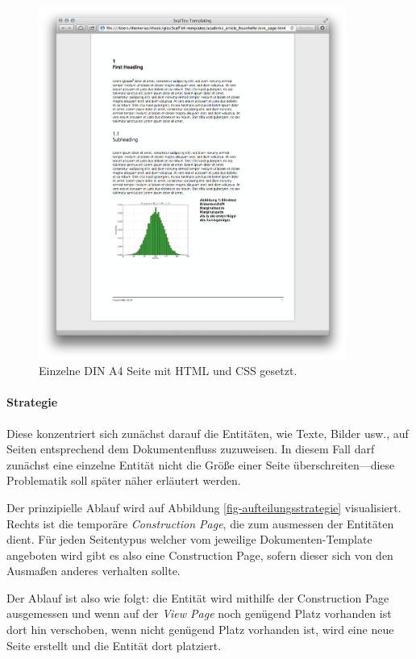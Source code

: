 \newpage
\begin{figure}[h!]
  \centering
    \includegraphics[width=0.9\textwidth]{figures/one_page.png}
  \caption{Einzelne DIN A4 Seite mit HTML und CSS gesetzt.}\label{fig-one_page}
\end{figure}
\newpage

\paragraph{Strategie}
Diese konzentriert sich zunächst darauf die Entitäten, wie Texte, Bilder usw.,
auf Seiten entsprechend dem Dokumentenfluss zuzuweisen.
In diesem Fall darf zunächst eine
einzelne Entität nicht die Größe einer Seite überschreiten---diese
Problematik soll später näher erläutert werden.

Der prinzipielle Ablauf wird auf Abbildung \ref{fig-aufteilungsstrategie}
visualisiert. Rechts ist die temporäre \emph{Construction Page}, die zum
ausmessen der Entitäten dient. Für jeden Seitentypus welcher vom jeweilige
Dokumenten-Template angeboten wird gibt es also eine Construction Page, sofern
dieser sich von den Ausmaßen anderes verhalten sollte.

Der Ablauf ist also wie folgt: die Entität wird mithilfe der Construction
Page ausgemessen und wenn auf der \emph{View Page} noch genügend Platz
vorhanden ist dort hin verschoben, wenn nicht genügend Platz vorhanden ist,
wird eine neue Seite erstellt und die Entität dort platziert.

